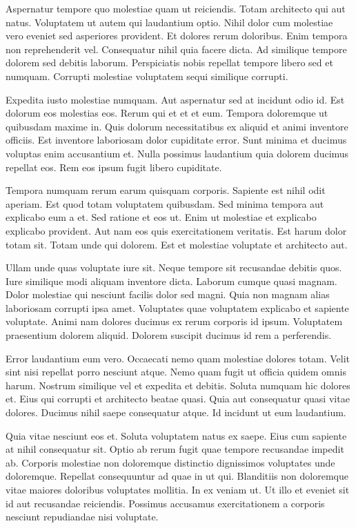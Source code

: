 Aspernatur tempore quo molestiae quam ut reiciendis. Totam architecto qui aut natus. Voluptatem ut autem qui laudantium optio. Nihil dolor cum molestiae vero eveniet sed asperiores provident. Et dolores rerum doloribus. Enim tempora non reprehenderit vel. Consequatur nihil quia facere dicta. Ad similique tempore dolorem sed debitis laborum. Perspiciatis nobis repellat tempore libero sed et numquam. Corrupti molestiae voluptatem sequi similique corrupti.

Expedita iusto molestiae numquam. Aut aspernatur sed at incidunt odio id. Est dolorum eos molestias eos. Rerum qui et et et eum. Tempora doloremque ut quibusdam maxime in. Quis dolorum necessitatibus ex aliquid et animi inventore officiis. Est inventore laboriosam dolor cupiditate error. Sunt minima et ducimus voluptas enim accusantium et. Nulla possimus laudantium quia dolorem ducimus repellat eos. Rem eos ipsum fugit libero cupiditate.

Tempora numquam rerum earum quisquam corporis. Sapiente est nihil odit aperiam. Est quod totam voluptatem quibusdam. Sed minima tempora aut explicabo eum a et. Sed ratione et eos ut. Enim ut molestiae et explicabo explicabo provident. Aut nam eos quis exercitationem veritatis. Est harum dolor totam sit. Totam unde qui dolorem. Est et molestiae voluptate et architecto aut.

Ullam unde quas voluptate iure sit. Neque tempore sit recusandae debitis quos. Iure similique modi aliquam inventore dicta. Laborum cumque quasi magnam. Dolor molestiae qui nesciunt facilis dolor sed magni. Quia non magnam alias laboriosam corrupti ipsa amet. Voluptates quae voluptatem explicabo et sapiente voluptate. Animi nam dolores ducimus ex rerum corporis id ipsum. Voluptatem praesentium dolorem aliquid. Dolorem suscipit ducimus id rem a perferendis.

Error laudantium eum vero. Occaecati nemo quam molestiae dolores totam. Velit sint nisi repellat porro nesciunt atque. Nemo quam fugit ut officia quidem omnis harum. Nostrum similique vel et expedita et debitis. Soluta numquam hic dolores et. Eius qui corrupti et architecto beatae quasi. Quia aut consequatur quasi vitae dolores. Ducimus nihil saepe consequatur atque. Id incidunt ut eum laudantium.

Quia vitae nesciunt eos et. Soluta voluptatem natus ex saepe. Eius cum sapiente at nihil consequatur sit. Optio ab rerum fugit quae tempore recusandae impedit ab. Corporis molestiae non doloremque distinctio dignissimos voluptates unde doloremque. Repellat consequuntur ad quae in ut qui. Blanditiis non doloremque vitae maiores doloribus voluptates mollitia. In ex veniam ut. Ut illo et eveniet sit id aut recusandae reiciendis. Possimus accusamus exercitationem a corporis nesciunt repudiandae nisi voluptate.

